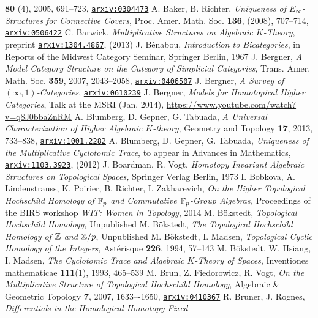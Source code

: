 \documentclass[12pt,bibliography=totoc,final]{scrbook} %
\def\arxiv#1{\href{http://arxiv.org/abs/#1}{\texttt{arxiv:#1}}} \def\arxivold#1{\href{http://arxiv.org/abs/math/#1}{\texttt{arxiv:#1}}}
\begin{document}
\begin{thebibliography}{9999999}
\textbf{80} (4), 2005, 691--723, \arxivold{0304473}
 A. Baker, B. Richter, \emph{Uniqueness of {$E_\infty$}-Structures for
Connective Covers}, Proc. Amer. Math. Soc. \textbf{136}, (2008), 707--714, \arxivold{0506422}
 C. Barwick, \emph{Multiplicative Structures on Algebraic $K$-Theory}, 
preprint \arxiv{1304.4867}, (2013)
 J. B\'enabou, \emph{Introduction to Bicategories}, in Reports of the Midwest
Category Seminar, Springer Berlin, 1967
 J. Bergner, \emph{A Model Category Structure on the Category of Simplicial
Categories}, Trans. Amer. Math. Soc. \textbf{359}, 2007, 2043--2058, \arxivold{0406507}
 J. Bergner, \emph{A Survey of $(\infty,1)$-Categories}, \arxivold{0610239}
 J. Bergner, \emph{Models for Homotopical Higher Categories}, Talk at
the MSRI (Jan. 2014), \href{https://www.youtube.com/watch?v=q8J0bbaZnRM}{https://www.youtube.com/watch?v=q8J0bbaZnRM}
 A. Blumberg, D. Gepner, G. Tabuada, \emph{A Universal Characterization
of Higher Algebraic $K$-theory}, {Geometry and Topology \textbf{17}}, 
2013, 733--838, \arxiv{1001.2282}
 A. Blumberg, D. Gepner, G. Tabuada, \emph{Uniqueness of the 
Multiplicative Cyclotomic Trace}, to appear in Advances in Mathematics, \arxiv{1103.3923}, (2012)
 J. Boardman, R. Vogt, \emph{Homotopy Invariant Algebraic Structures on Topological
Spaces,} Springer Verlag Berlin, 1973
 I. Bobkova, A. Lindenstrauss, K. Poirier, B. Richter, I. Zakharevich,
\emph{On the Higher Topological Hochschild Homology of $\mathbb{F}_p$ and Commutative $\mathbb{F}_p$-Group
Algebras,} Proceedings of the BIRS workshop \emph{WIT: Women in Topology}, 2014
 M. B\"okstedt, \emph{Topological Hochschild Homology,} Unpublished
 M. B\"okstedt, \emph{The Topological Hochschild Homology of $\mathbb{Z}$ and $\mathbb{Z}/p$},
Unpublished
 M. B\"okstedt, I. Madsen, \emph{Topological Cyclic Homology of the
Integers,} Ast\'erisque \textbf{226}, 1994, 57--143
 M. B\"okstedt, W. Hsiang, I. Madsen, \emph{The Cyclotomic Trace and 
Algebraic $K$-Theory of Spaces}, Inventiones mathematicae \textbf{111}(1), 1993, 465--539 %
 M. Brun, Z. Fiedorowicz, R. Vogt, \emph{On the Multiplicative 
Structure of Topological Hochschild Homology}, Algebraic \& Geometric 
Topology \textbf{7}, 2007, 1633–-1650, \arxivold{0410367}
 R. Bruner, J. Rognes, \emph{Differentials in the Homological Homotopy Fixed
}
\end{thebibliography}
\end{document}
